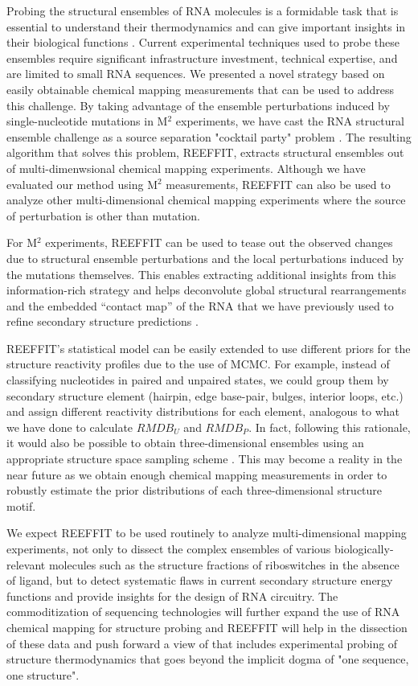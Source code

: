 \documentclass[12pt]{article}
\begin{document}
Probing the structural ensembles of RNA molecules is a formidable task that is essential to understand their thermodynamics and can give important insights in their biological functions \cite{Bothe2011}. Current experimental techniques used to probe these ensembles require significant infrastructure investment, technical expertise, and are limited to small RNA sequences. We presented a novel strategy based on easily obtainable chemical mapping measurements that can be used to address this challenge. By taking advantage of the ensemble perturbations induced by single-nucleotide mutations in M$^2$ experiments, we have cast the RNA structural ensemble challenge as a source separation "cocktail party" problem \cite{Cardoso1998}. The resulting algorithm that solves this problem, REEFFIT, extracts structural ensembles out of multi-dimenwsional chemical mapping experiments. Although we have evaluated our method using M$^2$ measurements, REEFFIT can also be used to analyze other multi-dimensional chemical mapping experiments where the source of perturbation is other than mutation. 

For M$^2$ experiments, REEFFIT can be used to tease out the observed changes due to structural ensemble perturbations and the local perturbations induced by the mutations themselves. This enables extracting additional insights from this information-rich strategy and helps deconvolute global structural rearrangements and the embedded “contact map” of the RNA that we have previously used to refine secondary structure predictions \cite{Kladwang2011f}.

REEFFIT's statistical model can be easily extended to use different priors for the structure reactivity profiles due to the use of MCMC. For example, instead of classifying nucleotides in paired and unpaired states, we could group them by secondary structure element (hairpin, edge base-pair, bulges, interior loops, etc.) and assign different reactivity distributions for each element, analogous to what we have done to calculate $RMDB_U$ and $RMDB_P$. In fact, following this rationale, it would also be possible to obtain three-dimensional ensembles using an appropriate structure space sampling scheme \cite{Frellsen2009,Das2007,Das2010,Jonikas2009}. This may become a reality in the near future as we obtain enough chemical mapping measurements in order to robustly estimate the prior distributions of each three-dimensional structure motif.

We expect REEFFIT to be used routinely to analyze multi-dimensional mapping experiments, not only to dissect the complex ensembles of various biologically-relevant molecules such as the structure fractions of riboswitches in the absence of ligand, but to detect systematic flaws in current secondary structure energy functions and provide insights for the design of RNA circuitry. The commoditization of sequencing technologies will further expand the use of RNA chemical mapping for structure probing and REEFFIT will help in the dissection of these data and push forward a view of that includes experimental probing of structure thermodynamics that goes beyond the implicit dogma of "one sequence, one structure". 
\end{document}
